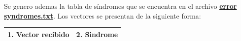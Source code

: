 
Se genero ademas la tabla de síndromes que se encuentra en el archivo \href{https://github.com/AbelCorvalan0/fec-lab2/tree/main/model/outputs/syndromes/error_syndromes.txt}{\textbf{error syndromes.txt}}. Los vectores se presentan de la siguiente forma:

\begin{table}[h!]
    \centering
    \begin{tabular}{|c|c|}
        \hline
        1. Vector recibido     &
        2. Sindrome \\
        \hline
    \end{tabular}
    \label{tab:decoder_output}
\end{table}




